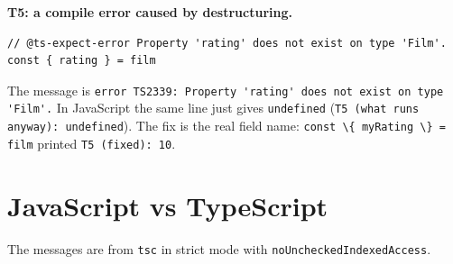 \documentclass[
]{article}
\newcommand{\passthrough}[1]{#1}
\begin{document}
\textbf{T5: a compile error caused by destructuring.}

\begin{lstlisting}
// @ts-expect-error Property 'rating' does not exist on type 'Film'.
const { rating } = film
\end{lstlisting}

The message is
\passthrough{\lstinline!error TS2339: Property 'rating' does not exist on type 'Film'.!}
In JavaScript the same line just gives
\passthrough{\lstinline!undefined!}
(\passthrough{\lstinline!T5 (what runs anyway): undefined!}). The fix is
the real field name:
\passthrough{\lstinline!const \{ myRating \} = film!} printed
\passthrough{\lstinline!T5 (fixed): 10!}.

\hypertarget{javascript-vs-typescript}{%
\section{JavaScript vs TypeScript}\label{javascript-vs-typescript}}

The messages are from \passthrough{\lstinline!tsc!} in strict mode with
\passthrough{\lstinline!noUncheckedIndexedAccess!}.
\end{document}
